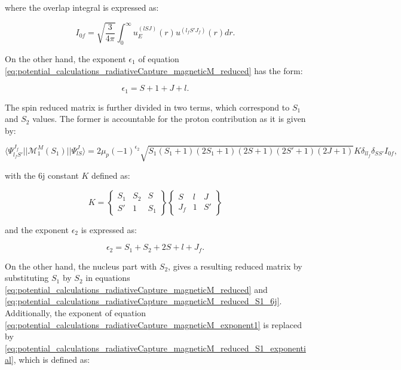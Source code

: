 \documentclass[openany]{book}
\begin{document}
where the overlap integral is expressed as:

\begin{equation}\label{eq:potential_calculations_radiativeCapture_magneticM_overlapIntegral}
	I_{0f} = \sqrt{\frac{3}{4\pi}} \int_{0}^{\infty} {u^{(lSJ)}_E (r)u^{(l_fS'J_f)}(r)dr}.
\end{equation}

On the other hand, the exponent $\epsilon_1$ of equation \ref{eq:potential_calculations_radiativeCapture_magneticM_reduced} has the form: 

\begin{equation}\label{eq:potential_calculations_radiativeCapture_magneticM_exponent1}
	\epsilon_1 = S + 1 + J + l.
\end{equation}

The spin reduced matrix is further divided in two terms, which correspond to $S_1$ and $S_2$ values. The former is accountable for the proton contribution as it is given by:

\begin{equation}\label{eq:potential_calculations_radiativeCapture_magneticM_reduced_S1}
	\langle \Psi^{J_f}_{l_fS'}  ||  \mathcal{M}^{M}_1(S_1) ||  \Psi^{J}_{lS} \rangle = 2\mu_p (-1)^{\epsilon_2} \sqrt{S_1(S_1+1)(2S_1 + 1)(2S + 1)(2S' + 1)(2J + 1)}  K \delta_{ll_f} \delta_{SS'} I_{0f},
\end{equation}

with the 6j constant $K$ defined as:

\begin{equation}\label{eq:potential_calculations_radiativeCapture_magneticM_reduced_S1_6j}
	K =	\left \{ \begin{matrix}
		S_1& S_2 & S\\
		S' & 1 & S_1
	\end{matrix} \right \}  \left \{ \begin{matrix}
	S & l & J\\
	J_f & 1 & S'
\end{matrix} \right \}
\end{equation}

and the exponent $\epsilon_2$ is expressed as: 

\begin{equation}\label{eq:potential_calculations_radiativeCapture_magneticM_reduced_S1_exponential}
	\epsilon_2 = S_1 + S_2 + 2S + l + J_f.
\end{equation}

On the other hand, the nucleus part with $S_2$, gives a resulting reduced matrix by substituting $S_1$ by $S_2$ in equations \ref{eq:potential_calculations_radiativeCapture_magneticM_reduced} and \ref{eq:potential_calculations_radiativeCapture_magneticM_reduced_S1_6j}. Additionally, the exponent of equation \ref{eq:potential_calculations_radiativeCapture_magneticM_exponent1} is replaced by \ref{eq:potential_calculations_radiativeCapture_magneticM_reduced_S1_exponential}, which is defined as:
\end{document}
